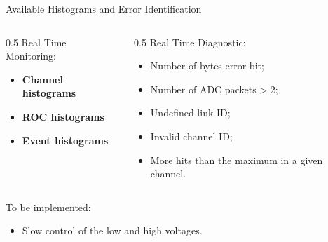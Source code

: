 \documentclass{beamer}[10pt]
\begin{document}
\begin{frame}{Available Histograms and Error Identification}
\begin{columns}
\begin{column}{0.5\framewidth}
Real Time Monitoring:
\vspace{4mm}
\begin{itemize}
\item  \textbf{Channel histograms}
\vspace{4mm}
\item \textbf{ROC histograms}
\vspace{4mm}
\item \textbf{Event histograms}
\vspace{4mm}
\end{itemize}
\end{column}
\begin{column}{0.5\framewidth}
Real Time Diagnostic:
\vspace{2mm}
\begin{itemize}
\item Number of bytes error bit; 
\vspace{2mm}
\item Number of ADC packets > 2;
\vspace{2mm}
\item Undefined link ID;
\vspace{2mm}
\item Invalid channel ID;
\vspace{2mm}
\item More hits than the maximum in a given channel.
\end{itemize}
\end{column}
\end{columns}
\vspace{4mm}
\centering
To be implemented:
\begin{itemize}
\vspace{2mm}
\centering
\item Slow control of the low and high voltages.
\end{itemize}
\end{frame}
\end{document}
